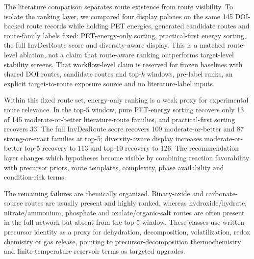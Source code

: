 \documentclass[11pt, letterpaper]{article}
\newcommand{\invdesroute}{InvDesRoute}
\begin{document}
The literature comparison separates route existence from route visibility. To isolate the ranking layer, we compared four display policies on the same 145 DOI-backed route records while holding PET energies, generated candidate routes and route-family labels fixed: PET-energy-only sorting, practical-first energy sorting, the full \invdesroute{} score and diversity-aware display. This is a matched route-level ablation, not a claim that route-aware ranking outperforms target-level stability screens. That workflow-level claim is reserved for frozen baselines with shared DOI routes, candidate routes and top-$k$ windows, pre-label ranks, an explicit target-to-route exposure source and no literature-label inputs.

Within this fixed route set, energy-only ranking is a weak proxy for experimental route relevance. In the top-5 window, pure PET-energy sorting recovers only 13 of 145 moderate-or-better literature-route families, and practical-first sorting recovers 33. The full \invdesroute{} score recovers 109 moderate-or-better and 87 strong-or-exact families at top-5; diversity-aware display increases moderate-or-better top-5 recovery to 113 and top-10 recovery to 126. The recommendation layer changes which hypotheses become visible by combining reaction favorability with precursor priors, route templates, complexity, phase availability and condition-risk terms.

The remaining failures are chemically organized. Binary-oxide and carbonate-source routes are usually present and highly ranked, whereas hydroxide/hydrate, nitrate/ammonium, phosphate and oxalate/organic-salt routes are often present in the full network but absent from the top-5 window. These classes use written precursor identity as a proxy for dehydration, decomposition, volatilization, redox chemistry or gas release, pointing to precursor-decomposition thermochemistry and finite-temperature reservoir terms as targeted upgrades.
\end{document}

